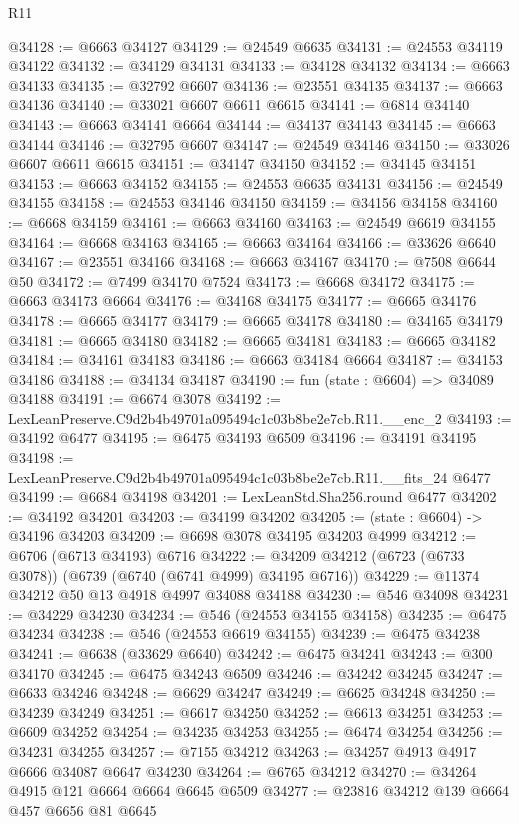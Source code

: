 \begin{lexlean}{R11}
\begin{coremodule}
@34128 := @6663 @34127
@34129 := @24549 @6635
@34131 := @24553 @34119 @34122
@34132 := @34129 @34131
@34133 := @34128 @34132
@34134 := @6663 @34133
@34135 := @32792 @6607
@34136 := @23551 @34135
@34137 := @6663 @34136
@34140 := @33021 @6607 @6611 @6615
@34141 := @6814 @34140
@34143 := @6663 @34141 @6664
@34144 := @34137 @34143
@34145 := @6663 @34144
@34146 := @32795 @6607
@34147 := @24549 @34146
@34150 := @33026 @6607 @6611 @6615
@34151 := @34147 @34150
@34152 := @34145 @34151
@34153 := @6663 @34152
@34155 := @24553 @6635 @34131
@34156 := @24549 @34155
@34158 := @24553 @34146 @34150
@34159 := @34156 @34158
@34160 := @6668 @34159
@34161 := @6663 @34160
@34163 := @24549 @6619 @34155
@34164 := @6668 @34163
@34165 := @6663 @34164
@34166 := @33626 @6640
@34167 := @23551 @34166
@34168 := @6663 @34167
@34170 := @7508 @6644 @50
@34172 := @7499 @34170 @7524
@34173 := @6668 @34172
@34175 := @6663 @34173 @6664
@34176 := @34168 @34175
@34177 := @6665 @34176
@34178 := @6665 @34177
@34179 := @6665 @34178
@34180 := @34165 @34179
@34181 := @6665 @34180
@34182 := @6665 @34181
@34183 := @6665 @34182
@34184 := @34161 @34183
@34186 := @6663 @34184 @6664
@34187 := @34153 @34186
@34188 := @34134 @34187
@34190 := fun (state : @6604) => @34089 @34188
@34191 := @6674 @3078
@34192 := LexLeanPreserve.C9d2b4b49701a095494c1c03b8be2e7cb.R11.__enc_2
@34193 := @34192 @6477
@34195 := @6475 @34193 @6509
@34196 := @34191 @34195
@34198 := LexLeanPreserve.C9d2b4b49701a095494c1c03b8be2e7cb.R11.__fits_24 @6477
@34199 := @6684 @34198
@34201 := LexLeanStd.Sha256.round @6477
@34202 := @34192 @34201
@34203 := @34199 @34202
@34205 := (state : @6604) -> @34196 @34203
@34209 := @6698 @3078 @34195 @34203 @4999
@34212 := @6706 (@6713 @34193) @6716
@34222 := @34209 @34212 (@6723 (@6733 @3078)) (@6739 (@6740 (@6741 @4999) @34195 @6716))
@34229 := @11374 @34212 @50 @13 @4918 @4997 @34088 @34188
@34230 := @546 @34098
@34231 := @34229 @34230
@34234 := @546 (@24553 @34155 @34158)
@34235 := @6475 @34234
@34238 := @546 (@24553 @6619 @34155)
@34239 := @6475 @34238
@34241 := @6638 (@33629 @6640)
@34242 := @6475 @34241
@34243 := @300 @34170
@34245 := @6475 @34243 @6509
@34246 := @34242 @34245
@34247 := @6633 @34246
@34248 := @6629 @34247
@34249 := @6625 @34248
@34250 := @34239 @34249
@34251 := @6617 @34250
@34252 := @6613 @34251
@34253 := @6609 @34252
@34254 := @34235 @34253
@34255 := @6474 @34254
@34256 := @34231 @34255
@34257 := @7155 @34212
@34263 := @34257 @4913 @4917 @6666 @34087 @6647 @34230
@34264 := @6765 @34212
@34270 := @34264 @4915 @121 @6664 @6664 @6645 @6509
@34277 := @23816 @34212 @139 @6664 @457 @6656 @81 @6645

\end{coremodule}
\end{lexlean}
